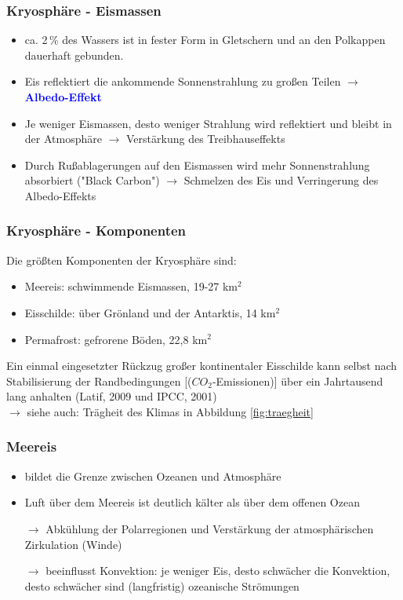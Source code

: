 \begin{frame}
	\frametitle{Kryosphäre - Eismassen} %
	\begin{itemize}
		\item ca. 2\,\% des Wassers ist in fester Form in Gletschern und an den Polkappen dauerhaft gebunden.
		\item Eis reflektiert die ankommende Sonnenstrahlung zu großen Teilen
		$\rightarrow$ \textbf{\textcolor{blue}{Albedo-Effekt}}\\
		
		\item Je weniger Eismassen, desto weniger Strahlung wird reflektiert und bleibt in der Atmosphäre $\rightarrow$ Verstärkung des Treibhauseffekts
		
		\item Durch Rußablagerungen auf den Eismassen wird mehr Sonnenstrahlung absorbiert ("Black Carbon")
		 $\rightarrow$ Schmelzen des Eis und Verringerung des Albedo-Effekts %
	\end{itemize}
	
\end{frame}

\begin{frame}
	\frametitle{Kryosphäre - Komponenten}
	Die größten Komponenten der Kryosphäre sind: 
	\begin{itemize}
		\item Meereis: schwimmende Eismassen, 19-27 km$^2$
		\item Eisschilde: über Grönland und der Antarktis, 14 km$^2$
		\item Permafrost: gefrorene Böden, 22,8 km$^2$
	\end{itemize}
	
	\glqq Ein einmal eingesetzter Rückzug großer kontinentaler Eisschilde kann selbst nach Stabilisierung der Randbedingungen [($CO_2$-Emissionen)] über ein Jahrtausend lang anhalten\grqq{} (Latif, 2009 und IPCC, 2001)\\
	$\rightarrow$ siehe auch: Trägheit des Klimas in Abbildung \ref{fig:traegheit}
\end{frame}

\begin{frame}
	\frametitle{Meereis}
	\begin{itemize}
		\item bildet die Grenze zwischen Ozeanen und Atmosphäre
		\item Luft über dem Meereis ist deutlich kälter als über dem offenen Ozean 
		\item [$\rightarrow$] Abkühlung der Polarregionen und Verstärkung der atmosphärischen Zirkulation (Winde)
		\item [$\rightarrow$] beeinflusst Konvektion: je weniger Eis, desto schwächer die Konvektion, desto schwächer sind (langfristig) ozeanische Strömungen 
	\end{itemize}
\end{frame}


